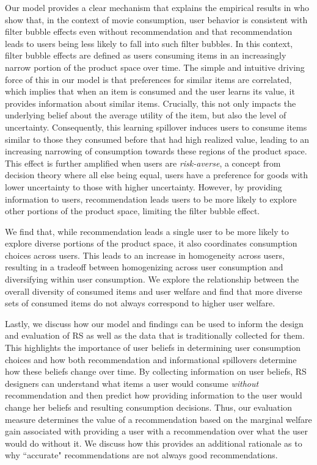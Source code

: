 \documentclass[manuscript]{acmart}
\newcommand{\xhdr}[1]{\vspace{1mm} \noindent{\bf #1}}
\begin{document}
\xhdr{Our Contributions}
Our model provides a clear mechanism that explains the empirical results in \cite{nguyen2014exploring} who show that, in the context of movie consumption, user behavior is consistent with filter bubble effects even without recommendation and that recommendation leads to users being less likely to fall into such filter bubbles. In this context, filter bubble effects are defined as users consuming items in an increasingly narrow portion of the product space over time. The simple and intuitive driving force of this in our model is that preferences for similar items are correlated, which implies that when an item is consumed and the user learns its value, it provides information about similar items. Crucially, this not only impacts the underlying belief about the average utility of the item, but also the level of uncertainty. Consequently, this learning spillover induces users to consume items similar to those they consumed before that had high realized value, leading to an increasing narrowing of consumption towards these regions of the product space. This effect is further amplified when users are \textit{risk-averse}, a concept from decision theory where all else being equal, users have a preference for goods with lower uncertainty to those with higher uncertainty. However, by providing information to users, recommendation leads users to be more likely to explore other portions of the product space, limiting the filter bubble effect.
\par
We find that, while recommendation leads a single user to be more likely to explore diverse portions of the product space, it also coordinates consumption choices across users. This leads to an increase in homogeneity across users, resulting in a tradeoff between homogenizing across user consumption and diversifying within user consumption. We explore the relationship between the overall diversity of consumed items and user welfare and find that more diverse sets of consumed items do not always correspond to higher user welfare. 
\par
Lastly, we discuss how our model and findings can be used to inform the design and evaluation of RS as well as the data that is traditionally collected for them. This highlights the importance of user beliefs in determining user consumption choices and how both recommendation and informational spillovers determine how these beliefs change over time. By collecting information on user beliefs, RS designers can understand what items a user would consume \textit{without} recommendation and then predict how providing information to the user would change her beliefs and resulting consumption decisions. Thus,  our evaluation measure determines the value of a recommendation based on the marginal welfare gain associated with providing a user with a recommendation over what the user would do without it. We discuss how this provides an additional rationale as to why ``accurate" recommendations are not always good recommendations.
\end{document}

